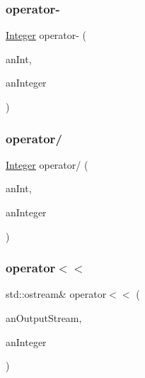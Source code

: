 \subsubsection{\texorpdfstring{operator-\/}{operator-}}
{\footnotesize\ttfamily \hyperlink{classlibrary_1_1core_1_1types_1_1_integer}{Integer} operator-\/ (\begin{DoxyParamCaption}\item[{const \hyperlink{classlibrary_1_1core_1_1types_1_1_integer_a623afb1580f870fd8a1997b1c12c917d}{Integer\+::\+Value\+Type} \&}]{an\+Int,  }\item[{const \hyperlink{classlibrary_1_1core_1_1types_1_1_integer}{Integer} \&}]{an\+Integer }\end{DoxyParamCaption})\hspace{0.3cm}{\ttfamily [friend]}}

\mbox{\label{classlibrary_1_1core_1_1types_1_1_integer_a61328fcdbfeebf2840a138de4f638789}} 
\subsubsection{\texorpdfstring{operator/}{operator/}}
{\footnotesize\ttfamily \hyperlink{classlibrary_1_1core_1_1types_1_1_integer}{Integer} operator/ (\begin{DoxyParamCaption}\item[{const \hyperlink{classlibrary_1_1core_1_1types_1_1_integer_a623afb1580f870fd8a1997b1c12c917d}{Integer\+::\+Value\+Type} \&}]{an\+Int,  }\item[{const \hyperlink{classlibrary_1_1core_1_1types_1_1_integer}{Integer} \&}]{an\+Integer }\end{DoxyParamCaption})\hspace{0.3cm}{\ttfamily [friend]}}

\mbox{\label{classlibrary_1_1core_1_1types_1_1_integer_aec29fc1731201932ab34cfe2ec83fbc9}} 
\subsubsection{\texorpdfstring{operator$<$$<$}{operator<<}}
{\footnotesize\ttfamily std\+::ostream\& operator$<$$<$ (\begin{DoxyParamCaption}\item[{std\+::ostream \&}]{an\+Output\+Stream,  }\item[{const \hyperlink{classlibrary_1_1core_1_1types_1_1_integer}{Integer} \&}]{an\+Integer }\end{DoxyParamCaption})\hspace{0.3cm}{\ttfamily [friend]}}



